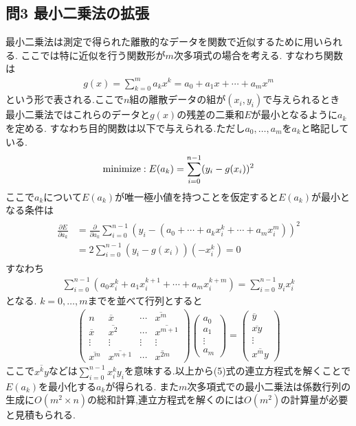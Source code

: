 \subsection*{問3 最小二乗法の拡張}
最小二乗法は測定で得られた離散的なデータを関数で近似するために用いられる.
ここでは特に近似を行う関数形が$m$次多項式の場合を考える.
すなわち関数は
\begin{align}
  g(x)=\sum_{k=0}^{m} a_kx^k=a_0+a_1x+\cdots+a_mx^m
\end{align}
という形で表される.ここで$n$組の離散データの組が$(x_i,y_i)$で与えられるとき
最小二乗法ではこれらのデータと$g(x)$の残差の二乗和$E$が最小となるように$a_k$を定める.
すなわち目的関数は以下で与えられる.ただし$a_0,\ldots,a_m$を$a_k$と略記している.
\begin{align}
  {\rm minimize}: E(a_k)=\sum_{i=0}^{n-1}(y_i-g(x_i))^2
\end{align}
ここで$a_k$について$E(a_k)$が唯一極小値を持つことを仮定すると$E(a_k)$が最小となる条件は
\begin{align}
  \begin{split}
    \frac{\partial E}{\partial a_k}&=\frac{\partial}{\partial a_k}\sum_{i=0}^{n-1}(y_i-(a_0+\cdots+a_kx_i^k+\cdots+a_mx_i^m))^2\\
    &=2\sum_{i=0}^{n-1}(y_i-g(x_i))(-x_i^k)=0
  \end{split}
\end{align}
すなわち
\begin{align}
  \sum_{i=0}^{n-1}(a_0x_i^k+a_1x_i^{k+1}+\cdots+a_mx_i^{k+m})=\sum_{i=0}^{n-1}y_ix_i^k
\end{align}
となる.
$k=0,\ldots,m$までを並べて行列とすると
\begin{align}
  \left(
    \begin{array}{cccc}
      n&\overline{x}&\cdots&\overline{x^m}\\
      \overline{x}&\overline{x^2}&\cdots&\overline{x^{m+1}}\\
      \vdots&\vdots&\vdots&\vdots\\
      \overline{x^m}&\overline{x^{m+1}}&\cdots&\overline{x^{2m}}
    \end{array}
  \right)
  \left(
    \begin{array}{c}
      a_0\\a_1\\\vdots\\a_m      
    \end{array}
  \right)=\left(
    \begin{array}{c}
      \overline{y}\\\overline{xy}\\\vdots\\\overline{x^my}
    \end{array}
  \right)
\end{align}
ここで$\overline{x^ky}$などは$\sum_{i=0}^{n-1}x^k_iy_i$を意味する.以上から(5)式の連立方程式を解くことで$E(a_k)$を最小化する$a_k$が得られる.
また$m$次多項式での最小二乗法は係数行列の生成に$O(m^2\times n)$の総和計算,連立方程式を解くのには$O(m^2)$の計算量が必要と見積もられる.

